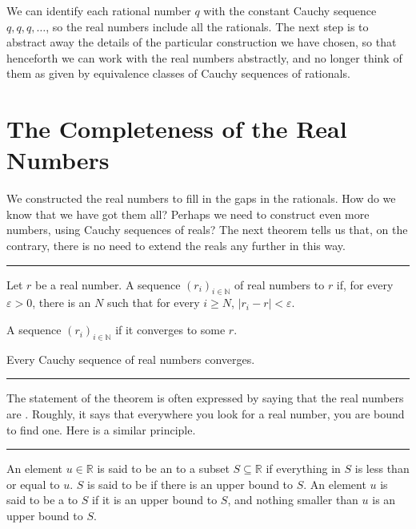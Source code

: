 \documentclass[letterpaper,10pt,english]{sphinxmanual}
\begin{document}
\sphinxAtStartPar
We can identify each rational number \(q\) with the constant Cauchy sequence \(q, q, q, \ldots\), so the real numbers include all the rationals. The next step is to abstract away the details of the particular construction we have chosen, so that henceforth we can work with the real numbers abstractly, and no longer think of them as given by equivalence classes of Cauchy sequences of rationals.


\section{The Completeness of the Real Numbers}
\label{\detokenize{the_real_numbers:the-completeness-of-the-real-numbers}}
\sphinxAtStartPar
We constructed the real numbers to fill in the gaps in the rationals. How do we know that we have got them all? Perhaps we need to construct even more numbers, using Cauchy sequences of reals? The next theorem tells us that, on the contrary, there is no need to extend the reals any further in this way.


\bigskip\hrule\bigskip


\sphinxAtStartPar
{} Let \(r\) be a real number. A sequence \((r_i)_{i \in \mathbb{N}}\) of real numbers  to \(r\) if, for every \(\varepsilon > 0\), there is an \(N\) such that for every \(i \geq N\), \(|r_i - r| < \varepsilon\).

\sphinxAtStartPar
{} A sequence \((r_i)_{i \in \mathbb{N}}\)  if it converges to some \(r\).

\sphinxAtStartPar
{} Every Cauchy sequence of real numbers converges.


\bigskip\hrule\bigskip


\sphinxAtStartPar
The statement of the theorem is often expressed by saying that the real numbers are . Roughly, it says that everywhere you look for a real number, you are bound to find one. Here is a similar principle.


\bigskip\hrule\bigskip


\sphinxAtStartPar
{} An element \(u \in \mathbb{R}\) is said to be an  to a subset \(S \subseteq \mathbb{R}\) if everything in \(S\) is less than or equal to \(u\). \(S\) is said to be  if there is an upper bound to \(S\). An element \(u\) is said to be a  to \(S\) if it is an upper bound to \(S\), and nothing smaller than \(u\) is an upper bound to \(S\).
\end{document}
